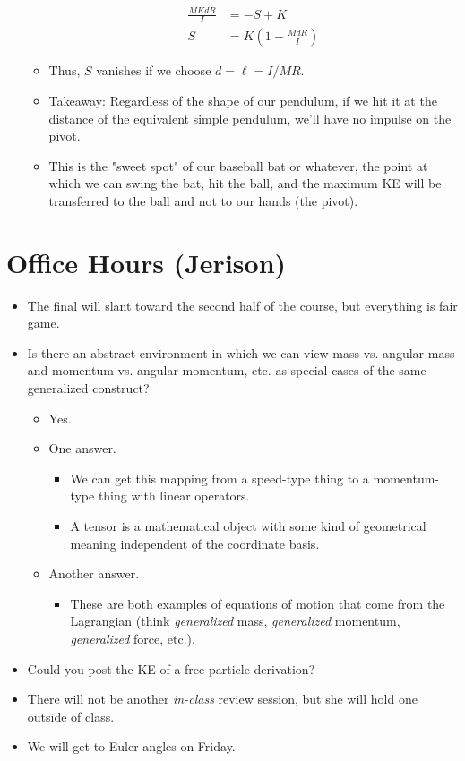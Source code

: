 \documentclass[../notes.tex]{subfiles}
\begin{document}
\begin{itemize}
\begin{itemize}
        \begin{align*}
            \frac{MKdR}{I} &= -S+K\\
            S &= K\left( 1-\frac{MdR}{I} \right)
        \end{align*}
        \item Thus, $S$ vanishes if we choose $d=\ell=I/MR$.
        \item Takeaway: Regardless of the shape of our pendulum, if we hit it at the distance of the equivalent simple pendulum, we'll have no impulse on the pivot.
        \item This is the "sweet spot" of our baseball bat or whatever, the point at which we can swing the bat, hit the ball, and the maximum KE will be transferred to the ball and not to our hands (the pivot).
    \end{itemize}
\end{itemize}



\section{Office Hours (Jerison)}
\begin{itemize}
    \item {}The final will slant toward the second half of the course, but everything is fair game.
    \item Is there an abstract environment in which we can view mass vs. angular mass and momentum vs. angular momentum, etc. as special cases of the same generalized construct?
    \begin{itemize}
        \item Yes.
        \item One answer.
        \begin{itemize}
            \item We can get this mapping from a speed-type thing to a momentum-type thing with linear operators.
            \item A tensor is a mathematical object with some kind of geometrical meaning independent of the coordinate basis.
        \end{itemize}
        \item Another answer.
        \begin{itemize}
            \item These are both examples of equations of motion that come from the Lagrangian (think \emph{generalized} mass, \emph{generalized} momentum, \emph{generalized} force, etc.).
        \end{itemize}
    \end{itemize}
    \item Could you post the KE of a free particle derivation?
    \item There will not be another \emph{in-class} review session, but she will hold one outside of class.
    \item We will get to Euler angles on Friday.
\end{itemize}
\end{document}
